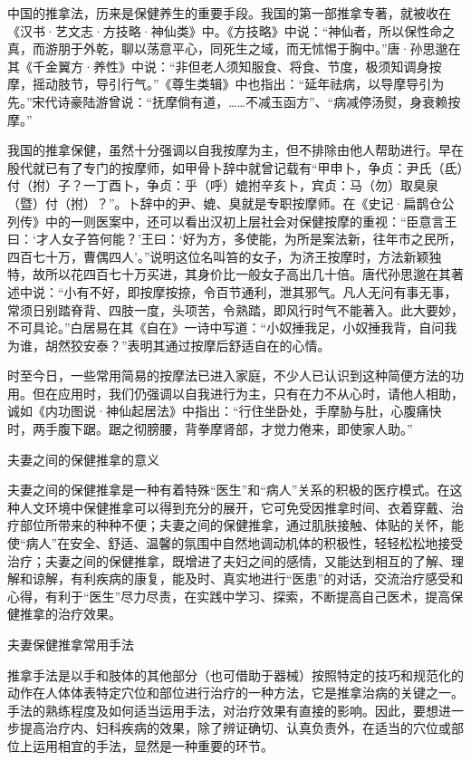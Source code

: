 \documentclass[12pt,UTF8,openany]{ctexbook}
\begin{document}
中国的推拿法，历来是保健养生的重要手段。我国的第一部推拿专著，就被收在《汉书·艺文志·方技略·神仙类》中。《方技略》中说：“神仙者，所以保性命之真，而游朋于外乾，聊以荡意平心，同死生之域，而无怵惕于胸中。”唐·孙思邈在其《千金翼方·养性》中说：“非但老人须知服食、将食、节度，极须知调身按摩，摇动肢节，导引行气。”《尊生类辑》中也指出：“延年祛病，以导摩导引为先。”宋代诗豪陆游曾说：“抚摩倘有道，……不减玉函方”、“病减停汤熨，身衰赖按摩。”

我国的推拿保健，虽然十分强调以自我按摩为主，但不排除由他人帮助进行。早在殷代就已有了专门的按摩师，如甲骨卜辞中就曾记载有“甲申卜，争贞：尹氏（氐）付（拊）子？一丁酉卜，争贞：乎（呼）媲拊辛亥卜，宾贞：马（勿）取臭泉（暨）付（拊）？”。卜辞中的尹、媲、臭就是专职按摩师。在《史记·扁鹊仓公列传》中的一则医案中，还可以看出汉初上层社会对保健按摩的重视：“臣意言王曰：‘才人女子笞何能？’王曰：‘好为方，多使能，为所是案法新，往年市之民所，四百七十万，曹偶四人’。”说明这位名叫笞的女子，为济王按摩时，方法新颖独特，故所以花四百七十万买进，其身价比一般女子高出几十倍。唐代孙思邈在其著述中说：“小有不好，即按摩按捺，令百节通利，泄其邪气。凡人无问有事无事，常须日别踏脊背、四肢一度，头项苦，令熟踏，即风行时气不能著入。此大要妙，不可具论。”白居易在其《自在》一诗中写道：“小奴捶我足，小奴捶我背，自问我为谁，胡然狡安泰？”表明其通过按摩后舒适自在的心情。

时至今日，一些常用简易的按摩法已进入家庭，不少人已认识到这种简便方法的功用。但在应用时，我们仍强调以自我进行为主，只有在力不从心时，请他人相助，诚如《内功图说·神仙起居法》中指出：“行住坐卧处，手摩胁与肚，心腹痛快时，两手腹下踞。踞之彻膀腰，背拳摩肾部，才觉力倦来，即使家人助。”





夫妻之间的保健推拿的意义


夫妻之间的保健推拿是一种有着特殊“医生”和“病人”关系的积极的医疗模式。在这种人文环境中保健推拿可以得到充分的展开，它可免受因推拿时间、衣着穿戴、治疗部位所带来的种种不便；夫妻之间的保健推拿，通过肌肤接触、体贴的关怀，能使“病人”在安全、舒适、温馨的氛围中自然地调动机体的积极性，轻轻松松地接受治疗；夫妻之间的保健推拿，既增进了夫妇之间的感情，又能达到相互的了解、理解和谅解，有利疾病的康复，能及时、真实地进行“医患”的对话，交流治疗感受和心得，有利于“医生”尽力尽责，在实践中学习、探索，不断提高自己医术，提高保健推拿的治疗效果。





夫妻保健推拿常用手法


推拿手法是以手和肢体的其他部分（也可借助于器械）按照特定的技巧和规范化的动作在人体体表特定穴位和部位进行治疗的一种方法，它是推拿治病的关键之一。手法的熟练程度及如何适当运用手法，对治疗效果有直接的影响。因此，要想进一步提高治疗内、妇科疾病的效果，除了辨证确切、认真负责外，在适当的穴位或部位上运用相宜的手法，显然是一种重要的环节。
\end{document}
